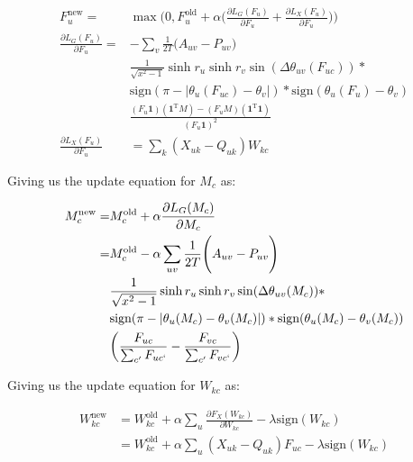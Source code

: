 \documentclass{article}
\begin{document}
	\begin{align}
	F_{u}^{\text{new}} =& \max\Bigg(0,  F_{u}^{\text{old}} + \alpha \Bigg(\frac{\partial L_G(F_u)}{\partial F_u} + \frac{\partial L_X(F_u)}{\partial F_u}\Bigg) \Bigg) \\
	\frac{\partial L_G(F_u)}{\partial F_u} =& - \sum_{v} \frac{1}{2T} \Bigg(A_{uv} - P_{uv} \Bigg) \\
	&\frac{1}{\sqrt{x^2 - 1}}\sinh r_u \sinh r_v \sin(\Delta \theta_{uv}(F_{uc})) *  \\
	&\text{sign}(\pi - |\theta_u(F_{uc}) - \theta_v|) * \text{sign}(\theta_u(F_{u}) - \theta_v) \\
	&\frac{(F_u \textbf{1})(\textbf{1}^{\text{T}} M) - (F_u M)(\textbf{1}^{\text{T}} \textbf{1})}{(F_u \textbf{1})^2} \\
	\frac{\partial L_X(F_u)}{\partial F_u} &= \sum_k (X_{uk} - Q_{uk}) W_{kc}
	\end{align}
	
	\hrulefill
	
	Giving us the update equation for $M_c$ as:
	
	\begin{align}
	M_{c}^{\text{new}} =& M_c^{\text{old}} + \alpha \frac{\partial L_G(M_c)}{\partial M_c} \\
	=& M_c^{\text{old}} - \alpha \sum_{uv} \frac{1}{2T} \Bigg(A_{uv} - P_{uv} \Bigg) \\
	&\frac{1}{\sqrt{x^2 - 1}}\sinh r_u \sinh r_v \sin(\Delta \theta_{uv}(M_c)) * \\
	&\text{sign}(\pi - |\theta_u(M_c) - \theta_v(M_c)|) * \text{sign}(\theta_u(M_c) - \theta_v(M_c)) \\
	&\bigg(\frac{F_{uc}}{\sum_{c'}F_{uc`}} - \frac{F_{vc}}{\sum_{c'}F_{vc`}} \bigg) 
	\end{align}
	
	\hrulefill
	
	Giving us the update equation for $W_{kc}$ as:
	
	\begin{align}
	W_{kc}^{\text{new}} &= W_{kc}^{\text{old}} + \alpha \sum_u \frac{\partial F_X (W_{kc})}{\partial W_{kc}} - \lambda \text{sign}(W_{kc}) \\
	& = W_{kc}^{\text{old}} + \alpha \sum_u (X_{uk} - Q_{uk}) F_{uc} - \lambda \text{sign}(W_{kc})
	\end{align}
		
	
\end{document}
